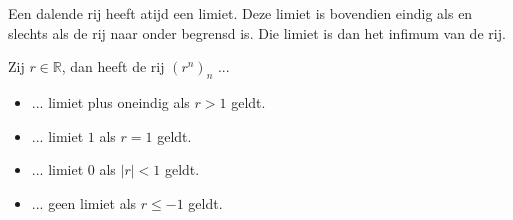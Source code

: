 \documentclass[main.tex]{subfiles}
\begin{document}
\begin{st}
  \label{st:dalend-dan-limiet}
  Een dalende rij heeft atijd een limiet.
  Deze limiet is bovendien eindig als en slechts als de rij naar onder begrensd is.
  Die limiet is dan het infimum van de rij.
\end{st}

\begin{bpr}
  Zij $r\in \mathbb{R}$, dan heeft de rij $(r^{n})_{n}$ ...
  \begin{itemize}
  \item ... limiet plus oneindig als $r>1$ geldt.
  \item ... limiet $1$ als $r=1$ geldt.
  \item ... limiet $0$ als $|r|<1$ geldt.
  \item ... geen limiet als $r\le-1$ geldt.
  \end{itemize}


\end{bpr}
\end{document}
